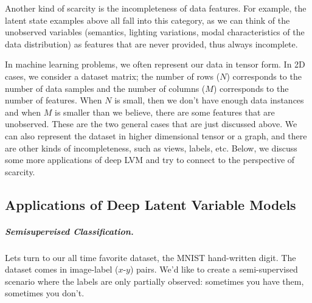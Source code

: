 \documentclass{article}
\begin{document}
Another kind of scarcity is the incompleteness of data features. 
For example, the latent state examples above all fall into this category, as we can think of the unobserved variables (semantics, lighting variations, modal characteristics of the data distribution) as features that are never provided, thus always incomplete.

In machine learning problems, we often represent our data in tensor form. 
In 2D cases, we consider a dataset matrix; the number of rows ($N$) corresponds to the number of data samples and the number of columns ($M$) corresponds to the number of features.
When $N$ is small, then we don't have enough data instances and when $M$ is smaller than we believe, there are some features that are unobserved. 
These are the two general cases that are just discussed above. 
We can also represent the dataset in higher dimensional tensor or a graph, and there are other kinds of incompleteness, such as views, labels, etc.
Below, we discuss some more applications of deep LVM and try to connect to the perspective of scarcity. 




\subsection{Applications of Deep Latent Variable Models}

\subparagraph{Semisupervised Classification.}
Lets turn to our all time favorite dataset, the MNIST hand-written digit. 
The dataset comes in image-label ($x$-$y$) pairs. 
We'd like to create a semi-supervised scenario where the labels are only partially observed: sometimes you have them, sometimes you don't.
\end{document}
